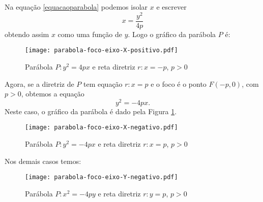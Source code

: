 Na equa\c{c}\~ao \eqref{equacaoparabola} podemos isolar $x$ e escrever
\[
  x = \dfrac{y^2}{4p}
\]
obtendo assim $x$ como uma fun\c{c}\~ao de $y$. Logo o gr\'afico da par\'abola $P$ \'e:

\begin{figure}[!h]%
  \centering
  \caption{Par\'abola $P: y^2 = 4px$ e reta diretriz $r: x = -p$, $p > 0$}
  \texttt{[image: parabola-foco-eixo-X-positivo.pdf]}
\end{figure}

Agora, se a diretriz de $P$ tem equa\c{c}\~ao $r: x = p$ e o foco \'e o ponto $F(-p,0)$, com $p > 0$, obtemos a equa\c{c}\~ao
\[
  y^2 = -4px.
\]
Neste caso, o gr\'afico da par\'abola \'e dado pela Figura \ref{FormageralParabola}.
\begin{figure}[!h]%
  \centering
  \caption{Par\'abola $P: y^2 = -4px$ e reta diretriz $r: x = p$, $p > 0$}
  \label{FormageralParabola}
  \texttt{[image: parabola-foco-eixo-X-negativo.pdf]}
\end{figure}

Nos demais casos temos:
\begin{figure}[!h]%
  \centering
  \caption{Par\'abola $P: x^2 = -4py$ e reta diretriz $r: y = p$, $p > 0$}
  \texttt{[image: parabola-foco-eixo-Y-negativo.pdf]}
\end{figure}

